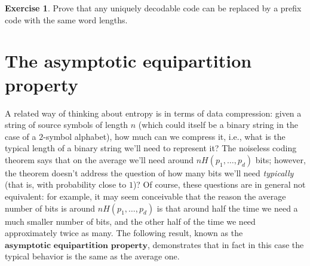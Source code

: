 \documentclass[11pt]{report}
\theoremstyle{plain}
\theoremstyle{definition}
\newtheorem{xexercise}[thm]{Exercise}
\begin{document}
\begin{xexercise}
\label{exer-uniquely-decodable}
Prove that any uniquely decodable code can be replaced by a prefix code with the same word lengths.
\end{xexercise}

\section{The asymptotic equipartition property}
A related way of thinking about entropy is in terms of data compression: given a string of source symbols of length $n$ (which could itself be a binary string in the case of a $2$-symbol alphabet), how much can we compress it, i.e., what is the typical length of a binary string we'll need to represent it? The noiseless coding theorem says that on the average we'll need around $n H(p_1,\ldots,p_d)$ bits; however, the theorem doesn't address the question of how many bits we'll need \emph{typically} (that is, with probability close to $1$)? Of course, these questions are in general not equivalent: for example, it may seem conceivable that the reason the average number of bits is around $nH(p_1,\ldots,p_d)$ is that around half the time we need a much smaller number of bits, and the other half of the time we need approximately twice as many. The following result, known as the $\textbf{asymptotic equipartition property}$, demonstrates that in fact in this case the typical behavior is the same as the average one.
\end{document}
